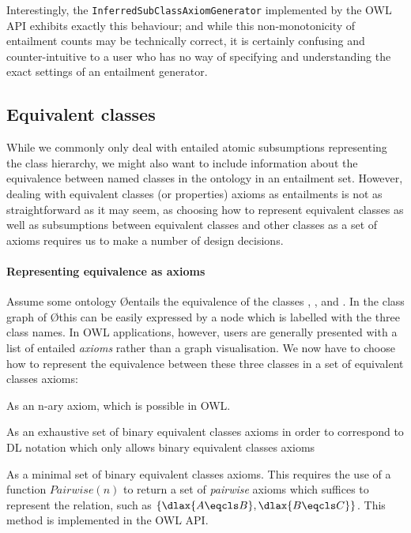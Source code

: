 Interestingly, the \texttt{InferredSubClassAxiomGenerator} implemented by the OWL API exhibits exactly this behaviour; and while this non-monotonicity of entailment counts may be technically correct, it is certainly confusing and counter-intuitive to a user who has no way of specifying and understanding the exact settings of an entailment generator.

\subsection{Equivalent classes}
\label{sec:repfunction}

While we commonly only deal with entailed atomic subsumptions representing the class hierarchy, we might also want to include information about the equivalence between named classes in the ontology in an entailment set. However, dealing with equivalent classes (or properties) axioms as entailments is not as straightforward as it may seem, as choosing how to represent equivalent classes as well as subsumptions between equivalent classes and other classes as a set of axioms requires us to make a number of design decisions.

\paragraph{Representing equivalence as axioms}

Assume some ontology \O entails the equivalence of the classes , , and . In the class graph of \O this can be easily expressed by a node which is labelled with the three class names. In OWL applications, however, users are generally presented with a list of entailed \emph{axioms} rather than a graph visualisation. We now have to choose how to represent the equivalence between these three classes in a set of equivalent classes axioms: 
\begin{compactenum}
\item As an n-ary  axiom, which is possible in OWL.
\item As an exhaustive set of binary equivalent classes axioms in order to correspond to DL notation which only allows binary equivalent classes axioms
\item As a minimal set of binary equivalent classes axioms. This requires the use of a function $Pairwise(n)$ to return a set of \emph{pairwise} axioms which suffices to represent the relation, such as $\{\dlax{A \eqcls B}, \dlax{B \eqcls C}\}$. This method is implemented in the OWL API.
\end{compactenum}

